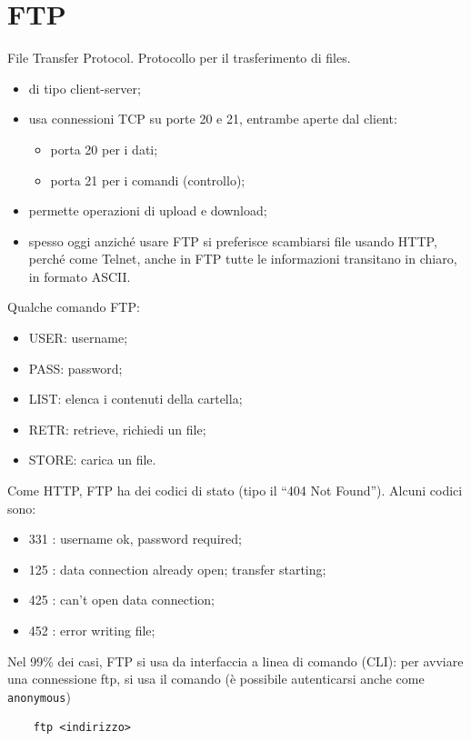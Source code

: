 \section*{\textcolor{Sepia}{FTP}}
\noindent \textcolor{Sepia}{F}ile \textcolor{Sepia}{T}ransfer \textcolor{Sepia}{P}rotocol. Protocollo per il trasferimento di files.\\

\begin{itemize}
    \item di tipo client-server;
    \item usa connessioni TCP su porte 20 e 21, entrambe aperte dal client:
    \begin{itemize}
        \item porta 20 per i dati;
        \item porta 21 per i comandi (controllo);
    \end{itemize}
    \item permette operazioni di upload e download;
    \item spesso oggi anziché usare FTP si preferisce scambiarsi file usando HTTP, perché come Telnet, anche in FTP tutte le informazioni transitano in chiaro, in formato ASCII.
\end{itemize}

\noindent Qualche comando FTP:
\begin{itemize}
    \item USER: username;
    \item PASS: password;
    \item LIST: elenca i contenuti della cartella;
    \item RETR: retrieve, richiedi un file;
    \item STORE: carica un file.
\end{itemize}

\noindent Come HTTP, FTP ha dei codici di stato (tipo il ``404 Not Found''). Alcuni codici sono:

\begin{itemize}
    \item 331 : username ok, password required;
    \item 125 : data connection already open; transfer starting;
    \item 425 : can't open data connection;
    \item 452 : error writing file;
\end{itemize}

\noindent Nel 99\% dei casi, FTP si usa da interfaccia a linea di comando (CLI): per avviare una connessione ftp, si usa il comando (è possibile autenticarsi anche come \texttt{anonymous})
\begin{verbatim}
    ftp <indirizzo>
\end{verbatim}

